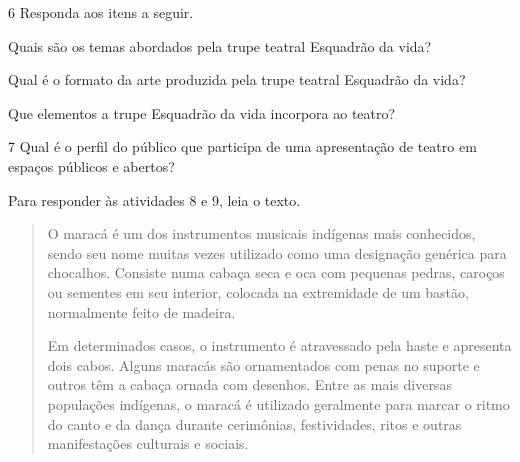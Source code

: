 \num{6}  Responda aos itens a seguir.

\begin{escolha}
\item Quais são os temas abordados pela trupe teatral Esquadrão da vida?


\item Qual é o formato da arte produzida pela trupe teatral Esquadrão da vida?


\item Que elementos a trupe Esquadrão da vida incorpora ao teatro?


\num{7} Qual é o perfil do público que participa de uma apresentação de teatro em espaços públicos e abertos?



Para responder às atividades 8 e 9, leia o texto.

%

\begin{quote}
O maracá é um dos instrumentos musicais indígenas mais conhecidos, sendo
seu nome muitas vezes utilizado como uma designação genérica para
chocalhos. Consiste numa cabaça seca e oca com pequenas pedras, caroços
ou sementes em seu interior, colocada na extremidade de um bastão,
normalmente feito de madeira.

Em determinados casos, o instrumento é atravessado pela haste e
apresenta dois cabos. Alguns maracás são ornamentados com penas no
suporte e outros têm a cabaça ornada com desenhos. Entre as mais
diversas populações indígenas, o maracá é utilizado geralmente para
marcar o ritmo do canto e da dança durante cerimônias, festividades,
ritos e outras manifestações culturais e sociais.


\end{quote}
\end{escolha}
